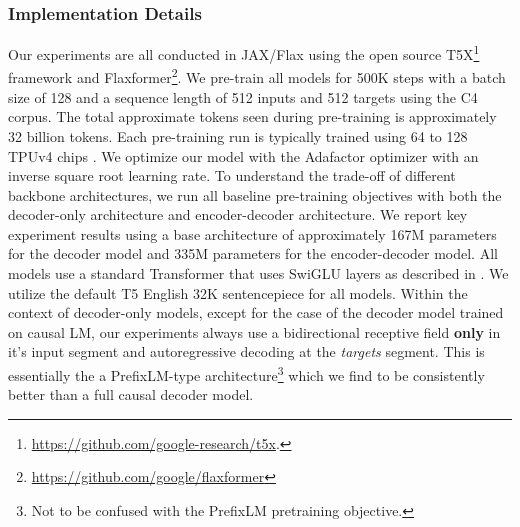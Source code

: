 \documentclass[10pt]{article}
\begin{document}
\subsubsection{Implementation Details}
Our experiments are all conducted in JAX/Flax \citep{jax2018github} using the open source T5X\footnote{\url{https://github.com/google-research/t5x}.} framework \citep{https://doi.org/10.48550/arxiv.2203.17189} and Flaxformer\footnote{\url{https://github.com/google/flaxformer}}. We pre-train all models for 500K steps with a batch size of 128 and a sequence length of 512 inputs and 512 targets using the C4 corpus. The total approximate tokens seen during pre-training is approximately 32 billion tokens. Each pre-training run is typically trained using 64 to 128 TPUv4 chips \citep{jouppi2020domain}. We optimize our model with the Adafactor \citep{shazeer2018adafactor} optimizer with an inverse square root learning rate. To understand the trade-off of different backbone architectures, we run all baseline pre-training objectives with both the decoder-only architecture and encoder-decoder architecture. We report key experiment results using a base architecture of approximately 167M parameters for the decoder model and 335M parameters for the encoder-decoder model. All models use a standard Transformer that uses SwiGLU layers as described in \citep{shazeer2020glu}. We utilize the default T5 English 32K sentencepiece for all models. Within the context of decoder-only models, except for the case of the decoder model trained on causal LM, our experiments always use a bidirectional receptive field \textbf{only} in it's input segment and autoregressive decoding at the \textit{targets} segment. This is essentially the a PrefixLM-type architecture\footnote{Not to be confused with the PrefixLM pretraining objective.} \citep{raffel2019exploring} which we find to be consistently better than a full causal decoder model.
\end{document}
